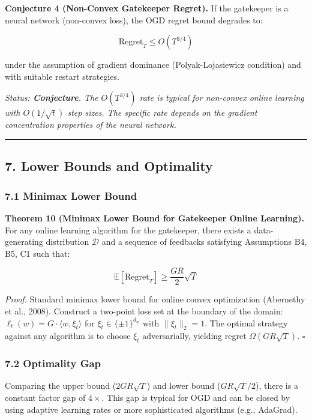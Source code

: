 \documentclass[
  12pt,
]{article}
\begin{document}
\textbf{Conjecture 4 (Non-Convex Gatekeeper Regret).} If the gatekeeper
is a neural network (non-convex loss), the OGD regret bound degrades to:

\[\text{Regret}_T \leq O(T^{3/4})\]

under the assumption of gradient dominance (Polyak-Lojasiewicz
condition) and with suitable restart strategies.

\emph{Status: \textbf{Conjecture}. The \(O(T^{3/4})\) rate is typical
for non-convex online learning with \(O(1/\sqrt{t})\) step sizes. The
specific rate depends on the gradient concentration properties of the
neural network.}

\begin{center}\rule{0.5\linewidth}{0.5pt}\end{center}

\subsection{7. Lower Bounds and
Optimality}\label{lower-bounds-and-optimality}

\subsubsection{7.1 Minimax Lower Bound}\label{minimax-lower-bound}

\textbf{Theorem 10 (Minimax Lower Bound for Gatekeeper Online
Learning).} For any online learning algorithm for the gatekeeper, there
exists a data-generating distribution \(\mathcal{D}\) and a sequence of
feedbacks satisfying Assumptions B4, B5, C1 such that:

\[\mathbb{E}[\text{Regret}_T] \geq \frac{GR}{2} \sqrt{T}\]

\emph{Proof.} Standard minimax lower bound for online convex
optimization (Abernethy et al., 2008). Construct a two-point loss set at
the boundary of the domain:
\(\ell_t(w) = G \cdot \langle w, \xi_t \rangle\) for
\(\xi_t \in \{\pm 1\}^{d_w}\) with \(\|\xi_t\|_2 = 1\). The optimal
strategy against any algorithm is to choose \(\xi_t\) adversarially,
yielding regret \(\Omega(GR\sqrt{T})\). \(\square\)

\subsubsection{7.2 Optimality Gap}\label{optimality-gap}

Comparing the upper bound (\(2GR\sqrt{T}\)) and lower bound
(\(GR\sqrt{T}/2\)), there is a constant factor gap of \(4\times\). This
gap is typical for OGD and can be closed by using adaptive learning
rates or more sophisticated algorithms (e.g., AdaGrad).
\end{document}
